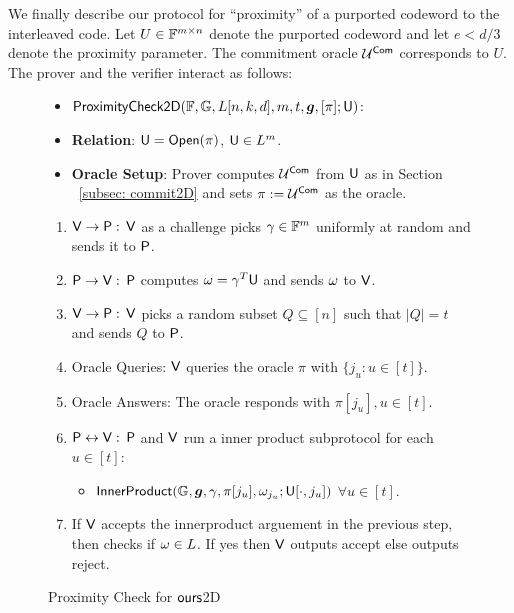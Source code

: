 We finally describe our protocol for ``proximity'' of a purported codeword to the interleaved code. Let $U\in \mathbb{F}^{m\times n}$ denote the purported codeword and let $e< d/3$ denote the proximity parameter. The commitment oracle $\mathcal{U}^{\mathsf{Com}}$ corresponds to $U$.
The prover and the verifier interact as follows:
\begin{figure}[h!]
	\centering
	\begin{framed}
		\begin{itemize}
			\item {$\mathsf{ProximityCheck2D}(\mathbb{F}, \mathbb{G}, L[n,k,d], m, t, \bm{g}, [\pi]; \mathsf{U})$}:
			\item {\bf Relation}: $\mathsf{U} = \mathsf{Open}(\pi)$, $\mathsf{U} \in L^m$.
			\item {\bf Oracle Setup}: Prover computes $\mathcal{U}^{\mathsf{Com}}$ from $\mathsf{U}$ as in Section ~\ref{subsec: commit2D} and sets $\pi := \mathcal{U}^{\mathsf{Com}}$ as the oracle.
		\end{itemize}
		\begin{enumerate}
			\item $\mathsf{V} \rightarrow \mathsf{P} :$ $\mathsf{V}$ as a challenge picks $\gamma \in \mathbb{F}^m$ uniformly at random and sends it to $\mathsf{P}$.
			
			\item $\mathsf{P} \rightarrow \mathsf{V} :$ $\mathsf{P}$ computes $\omega=\gamma^T\mathsf{U}$ and sends $\omega$ to $\mathsf{V}$.
			
			\item $\mathsf{V} \rightarrow \mathsf{P} :$ $\mathsf{V}$ picks a random subset $Q\subseteq [n]$ such that $|Q|=t$ and sends $Q$ to $\mathsf{P}$.
			
			\item Oracle Queries: $\mathsf{V}$ queries the oracle $\pi$ with $\{j_u:u\in[t]\}$.
			
			\item Oracle Answers: The oracle responds with $\pi[j_u], u\in[t]$.
			
			\item $\mathsf{P} \leftrightarrow \mathsf{V}: $ $\mathsf{P}$ and $\mathsf{V}$ run a inner product subprotocol for each $u\in[t]$:
			\begin{itemize}
				\item $\mathsf{InnerProduct}(\mathbb{G}, \bm{g}, \gamma, \pi[j_u], \omega_{j_u}; \mathsf{U}[\cdot,j_u])$ $\forall u\in [t]$.
			\end{itemize}
			
			\item If $\mathsf{V}$ accepts the innerproduct arguement in the previous step, then checks if $\omega\in L$. If yes then $\mathsf{V}$ outputs accept else outputs reject.
		\end{enumerate}
	\end{framed}
	\caption{Proximity Check for $\textsf{ours}$2D}
\end{figure}

